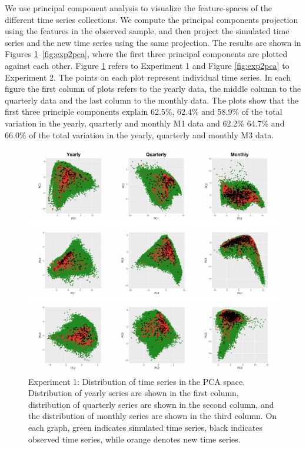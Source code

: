 \documentclass[11pt,a4paper,]{article}
\begin{document}
We use principal component analysis to visualize the feature-spaces of
the different time series collections. We compute the principal
components projection using the features in the observed sample, and
then project the simulated time series and the new time series using the
same projection. The results are shown in Figures
\ref{fig:exp1pca}--\ref{fig:exp2pca}, where the first three principal
components are plotted against each other. Figure \ref{fig:exp1pca}
refers to Experiment 1 and Figure \ref{fig:exp2pca} to Experiment 2. The
points on each plot represent individual time series. In each figure the
first column of plots refers to the yearly data, the middle column to
the quarterly data and the last column to the monthly data. The plots
show that the first three principle components explain 62.5\%, 62.4\%
and 58.9\% of the total variation in the yearly, quarterly and monthly
M1 data and 62.2\% 64.7\% and 66.0\% of the total variation in the
yearly, quarterly and monthly M3 data.

\begin{figure}

{\centering \includegraphics[width=\textwidth]{figure/exp1pca-1} 

}

\caption{Experiment 1: Distribution of time series in the PCA space. Distribution of yearly series are shown in the first column, distribution of quarterly series are shown in the second column, and the distribution of monthly series are shown in the third column. On each graph, green indicates simulated time series, black indicates observed time series, while orange denotes new time series.}\label{fig:exp1pca}
\end{figure}
\end{document}
